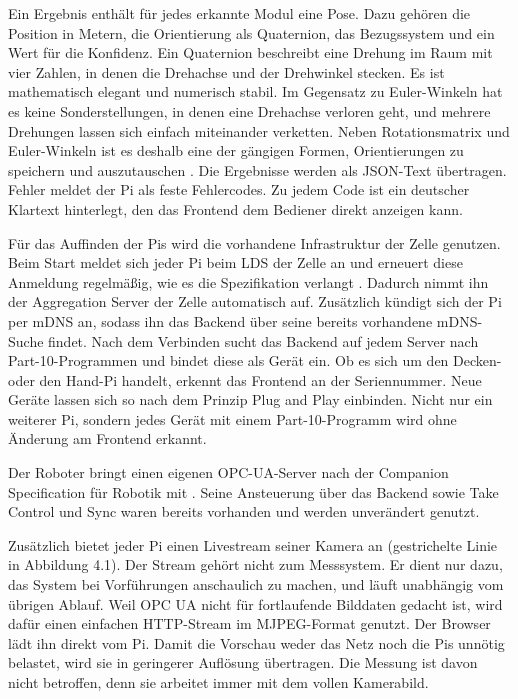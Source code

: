  Ein Ergebnis enthält für jedes erkannte Modul eine Pose. Dazu gehören die Position in Metern, die Orientierung als Quaternion, das Bezugssystem und ein Wert für die Konfidenz. Ein Quaternion beschreibt eine Drehung im Raum mit vier Zahlen, in denen die Drehachse und der Drehwinkel stecken. Es ist mathematisch elegant und numerisch stabil. Im Gegensatz zu Euler-Winkeln hat es keine Sonderstellungen, in denen eine Drehachse verloren geht, und mehrere Drehungen lassen sich einfach miteinander verketten. Neben Rotationsmatrix und Euler-Winkeln ist es deshalb eine der gängigen Formen, Orientierungen zu speichern und auszutauschen \cite{Diebel2006}. Die Ergebnisse werden als JSON-Text übertragen. Fehler meldet der Pi als feste Fehlercodes. Zu jedem Code ist ein deutscher Klartext hinterlegt, den das Frontend dem Bediener direkt anzeigen kann.

 Für das Auffinden der Pis wird die vorhandene Infrastruktur der Zelle genutzen. Beim Start meldet sich jeder Pi beim LDS der Zelle an und erneuert diese Anmeldung regelmäßig, wie es die Spezifikation verlangt \cite{OPC10000-4}. Dadurch nimmt ihn der Aggregation Server der Zelle automatisch auf. Zusätzlich kündigt sich der Pi per mDNS an, sodass ihn das Backend über seine bereits vorhandene mDNS-Suche findet. Nach dem Verbinden sucht das Backend auf jedem Server nach Part-10-Programmen und bindet diese als Gerät ein. Ob es sich um den Decken- oder den Hand-Pi handelt, erkennt das Frontend an der Seriennummer. Neue Geräte lassen sich so nach dem Prinzip Plug and Play einbinden. Nicht nur ein weiterer Pi, sondern jedes Gerät mit einem Part-10-Programm wird ohne Änderung am Frontend erkannt.

 Der Roboter bringt einen eigenen OPC-UA-Server nach der Companion Specification für Robotik mit \cite{OPC40010-1}. Seine Ansteuerung über das Backend sowie Take Control und Sync waren bereits vorhanden und werden unverändert genutzt.

Zusätzlich bietet jeder Pi einen Livestream seiner Kamera an (gestrichelte Linie in Abbildung 4.1). Der Stream gehört nicht zum Messsystem. Er dient nur dazu, das System bei Vorführungen anschaulich zu machen, und läuft unabhängig vom übrigen Ablauf. Weil OPC UA nicht für fortlaufende Bilddaten gedacht ist, wird dafür einen einfachen HTTP-Stream im MJPEG-Format genutzt. Der Browser lädt ihn direkt vom Pi. Damit die Vorschau weder das Netz noch die Pis unnötig belastet, wird sie in geringerer Auflösung übertragen. Die Messung ist davon nicht betroffen, denn sie arbeitet immer mit dem vollen Kamerabild.

